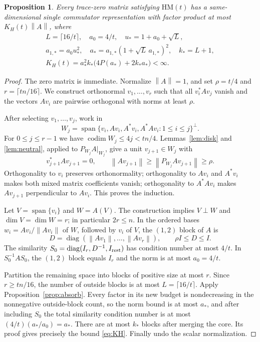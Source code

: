 \documentclass[11pt]{article}
\newtheorem{proposition}[theorem]{Proposition}
\theoremstyle{remark}
\newcommand{\diag}{\operatorname{diag}}
\newcommand{\codim}{\operatorname{codim}}
\newcommand{\Span}{\operatorname{span}}
\newcommand{\norm}[1]{\left\lVert#1\right\rVert}
\newcommand{\HM}{\mathrm{HM}}
\numberwithin{equation}{section}
\begin{document}
\begin{proposition}\label{prop:high}
Every trace-zero matrix satisfying $\HM(t)$ has a same-dimensional single
commutator representation with factor product at most $K_H(t)\norm A$, where
\begin{equation}\label{eq:KH}
\begin{gathered}
 L=\lceil16/t\rceil,\quad a_0=4/t,\quad u_*=1+a_0+\sqrt L,\\
 a_{1,*}=a_0u_*^2,\quad a_*=a_{1,*}(1+\sqrt L\,a_{1,*})^2,\quad k_*=L+1,\\
 K_H(t)=a_*^2k_*\bigl(4P(a_*)+2k_*a_*\bigr)<\infty.
\end{gathered}
\end{equation}
\end{proposition}
\begin{proof}
The zero matrix is immediate. Normalize $\norm A=1$, and set
$\rho=t/4$ and $r=\lceil tn/16\rceil$. We construct orthonormal
$v_1,\ldots,v_r$ such that all $v_i^*Av_j$ vanish and the vectors $Av_i$ are
pairwise orthogonal with norms at least $\rho$.

After selecting $v_1,\ldots,v_j$, work in
\[
 W_j=\Span\{v_i,Av_i,A^*v_i,A^*Av_i:1\le i\le j\}^{\perp}.
\]
For $0\le j\le r-1$ we have
$\codim W_j\le4j<tn/4$. Lemmas~\ref{lem:disk} and \ref{lem:neutral}, applied
to $P_{W_j}A|_{W_j}$, give a unit $v_{j+1}\in W_j$ with
\[
 v_{j+1}^*Av_{j+1}=0,\qquad
 \norm{Av_{j+1}}\ge\norm{P_{W_j}Av_{j+1}}\ge\rho.
\]
Orthogonality to $v_i$ preserves orthonormality; orthogonality to $Av_i$ and
$A^*v_i$ makes both mixed matrix coefficients vanish; orthogonality to
$A^*Av_i$ makes $Av_{j+1}$ perpendicular to $Av_i$. This proves the induction.

Let $V=\Span\{v_i\}$ and $W=A(V)$. The construction implies $V\perp W$ and
$\dim V=\dim W=r$; in particular $2r\le n$. In the ordered bases
$w_i=Av_i/\norm{Av_i}$ of $W$, followed by $v_i$ of $V$, the $(1,2)$ block of
$A$ is
\[
 D=\diag(\norm{Av_1},\ldots,\norm{Av_r}),\qquad \rho I\le D\le I.
\]
The similarity $S_0=\diag(I_r,D^{-1},I_{\rm rest})$ has condition number at
most $4/t$. In $S_0^{-1}AS_0$, the $(1,2)$ block equals $I_r$ and the norm is
at most $a_0=4/t$.

Partition the remaining space into blocks of positive size at most $r$. Since
$r\ge tn/16$, the number of outside blocks is at most $L=\lceil16/t\rceil$.
Apply Proposition~\ref{prop:absorb}. Every factor in its new budget is
nondecreasing in the nonnegative outside-block count, so the norm bound is at most $a_*$,
and after including $S_0$ the total similarity condition number is at most
$(4/t)(a_*/a_0)=a_*$. There are at most $k_*$ blocks after merging the core.
Its proof gives precisely the bound \eqref{eq:KH}. Finally undo the scalar
normalization.
\end{proof}
\end{document}
